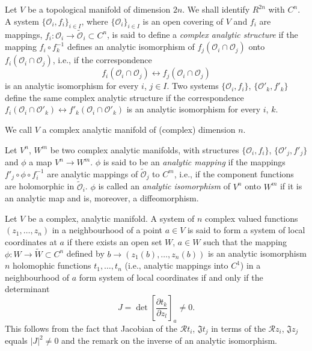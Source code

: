 \begin{defi*}
Let $V$ be a topological manifold of dimension $2n$. We shall identify
$R^{2n}$ with $C^n$. A system $\{\mathscr{O}_i , f_i\}_{i \in I}$,
where $\{\mathscr{O}_i\}_{i\in I}$ is an open covering of $V$ and
$f_i$ are mappings, $f_i : \mathscr{O}_i \to \widetilde{\mathscr{O}^{}}_i
\subset C^n$, is said to define a
\textit{complex analytic structure} if the mapping $f_i \circ
f^{-1}_k$ defines an analytic isomorphism of $f_j(\mathscr{O}_i \cap
\mathscr{O}_j)$ onto $f_i (\mathscr{O}_i \cap \mathscr{O}_j)$, i.e.,
if the correspondence
$$
f_i (\mathscr{O}_i \cap \mathscr{O}_j) \longleftrightarrow f_j
(\mathscr{O}_i \cap \mathscr{O}_j) 
$$
is an analytic isomorphism for every $i$, $j \in I$. Two systems 
$\{\mathscr{O}_i, f_i\}$, $\{\mathscr{O}'_k, f'_k\}$\pageoriginale
define the same complex analytic structure if the correspondence $f_i
(\mathscr{O}_i \cap \mathscr{O}'_k) \longleftrightarrow f'_k
(\mathscr{O}_i \cap \mathscr{O}'_k)$  is an analytic isomorphism for
every $i$, $k$.

We call $V$ a complex analytic manifold of (complex) dimension $n$.
\end{defi*}

\begin{defi*}
Let $V^n$, $W^m$ be two complex analytic manifolds, with structures
$\{\mathscr{O}_i, f_i\}$, $\{\mathscr{O}'_j, f'_j\}$ and $\phi$ a map
$V^n \to W^m$. $\phi$ is said to be an \textit{analytic mapping} if
the mappings $f'_j \circ \phi \circ f^{-1}_i$ are analytic mappings of
$\tilde{\mathscr{O}}_j$ to $C^m$, i.e., if the component functions are
holomorphic in $\tilde{\mathscr{O}}_i$. $\phi$ is called an
\textit{analytic isomorphism} of $V^n$ onto $W^m$ if it is an analytic
map and is, moreover, a diffeomorphism.
\end{defi*}

\medskip
{}

Let $V$ be a complex, analytic manifold. A system of $n$ complex
valued functions $(z_1, \ldots, z_n)$ in a neighbourhood of a point $a
\in V$ is said to form a system of local coordinates at $a$ if there
exists an open set $W$, $a \in W$ such that the mapping $\phi : W \to
\tilde{W} \subset C^n$ defined by $b \to (z_1(b), \ldots, z_n (b))$ is
an analytic isomorphism $n$ holomophic functions $t_1, \ldots, t_n$
(i.e., analytic mappings into $C^1$) in a neighbourhood of $a$ form
system of local coordinates if and only if the determinant 
$$
J = \det \left[ \frac{\partial t_k}{\partial z_l}\right]_a \neq 0.
$$
This follows from the fact that Jacobian of the $\mathscr{R}t_i$,
$\mathfrak{J} t_j$ in terms of the $\mathscr{R} z_i$, $\mathfrak{J}
z_j$ equals $|J|^2 \neq 0$ and the remark on the inverse of an
analytic isomorphism. 

